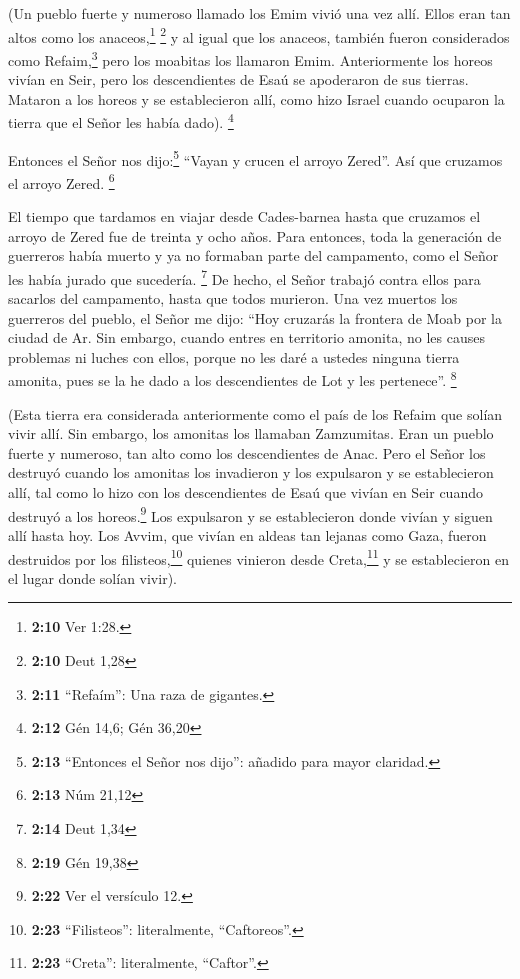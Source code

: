  (Un pueblo fuerte y numeroso llamado los Emim vivió una
vez allí. Ellos eran tan altos como los anaceos,\footnote{\textbf{2:10}
  Ver 1:28.} \footnote{\textbf{2:10} Deut 1,28}  y al
igual que los anaceos, también fueron considerados como
Refaim,\footnote{\textbf{2:11} ``Refaím'': Una raza de gigantes.} pero
los moabitas los llamaron Emim.  Anteriormente los horeos
vivían en Seir, pero los descendientes de Esaú se apoderaron de sus
tierras. Mataron a los horeos y se establecieron allí, como hizo Israel
cuando ocuparon la tierra que el Señor les había dado). \footnote{\textbf{2:12}
  Gén 14,6; Gén 36,20}

 Entonces el Señor nos dijo:\footnote{\textbf{2:13}
  ``Entonces el Señor nos dijo'': añadido para mayor claridad.} ``Vayan
y crucen el arroyo Zered''. Así que cruzamos el arroyo Zered.
\footnote{\textbf{2:13} Núm 21,12}

 El tiempo que tardamos en viajar desde Cades-barnea
hasta que cruzamos el arroyo de Zered fue de treinta y ocho años. Para
entonces, toda la generación de guerreros había muerto y ya no formaban
parte del campamento, como el Señor les había jurado que sucedería.
\footnote{\textbf{2:14} Deut 1,34}  De hecho, el Señor
trabajó contra ellos para sacarlos del campamento, hasta que todos
murieron.  Una vez muertos los guerreros del pueblo,
 el Señor me dijo:  ``Hoy cruzarás la
frontera de Moab por la ciudad de Ar.  Sin embargo,
cuando entres en territorio amonita, no les causes problemas ni luches
con ellos, porque no les daré a ustedes ninguna tierra amonita, pues se
la he dado a los descendientes de Lot y les pertenece''. \footnote{\textbf{2:19}
  Gén 19,38}

 (Esta tierra era considerada anteriormente como el país
de los Refaim que solían vivir allí. Sin embargo, los amonitas los
llamaban Zamzumitas.  Eran un pueblo fuerte y numeroso,
tan alto como los descendientes de Anac. Pero el Señor los destruyó
cuando los amonitas los invadieron y los expulsaron y se establecieron
allí,  tal como lo hizo con los descendientes de Esaú que
vivían en Seir cuando destruyó a los horeos.\footnote{\textbf{2:22} Ver
  el versículo 12.} Los expulsaron y se establecieron donde vivían y
siguen allí hasta hoy.  Los Avvim, que vivían en aldeas
tan lejanas como Gaza, fueron destruidos por los filisteos,\footnote{\textbf{2:23}
  ``Filisteos'': literalmente, ``Caftoreos''.} quienes vinieron desde
Creta,\footnote{\textbf{2:23} ``Creta'': literalmente, ``Caftor''.} y se
establecieron en el lugar donde solían vivir).

